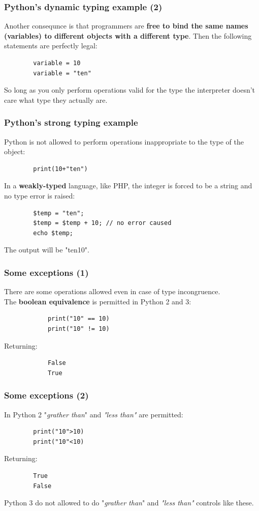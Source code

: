 \documentclass[xcolor ={table,usenames,dvipsnames}]{beamer}
\theoremstyle{definition}
\begin{document}
	\begin{frame}[fragile]
		\frametitle{Python's dynamic typing example (2)}
		Another consequnce is that programmers are \textbf{free to bind the same names (variables) to different objects with a different type}. Then the following statements are perfectly legal:
		
		\begin{lstlisting}
		variable = 10
		variable = "ten"
		\end{lstlisting}
		
		So long as you only perform operations valid for the type the interpreter doesn't care what type they actually are. 
	\end{frame}

	\begin{frame}[fragile]
		\frametitle{Python's strong typing example}
		Python is not allowed to perform operations inappropriate to the type of the object: 
		\begin{lstlisting}
		print(10+"ten")
		\end{lstlisting}
		
		In a \textbf{weakly-typed} language, like PHP, the integer is forced to be a string and no type error is raised:
		\begin{lstlisting}
		$temp = "ten"; 
		$temp = $temp + 10; // no error caused
		echo $temp;
		\end{lstlisting}
	The output will be "ten10".
	\end{frame}

	\begin{frame}[fragile]
		\frametitle{Some exceptions (1)}
		There are some operations allowed even in case of type incongruence.\\
		The\textbf{ boolean equivalence} is permitted in Python 2 and 3: 
		
		\begin{lstlisting}
			print("10" == 10)
			print("10" != 10)
		\end{lstlisting}
		Returning:
		\begin{lstlisting}
			False
			True
		\end{lstlisting}
	\end{frame}

	\begin{frame}[fragile]
		\frametitle{Some exceptions (2)}
		In Python 2 "\textit{grather than}" and \textit{"less than"} are permitted:
		
		\begin{lstlisting}
		print("10">10)
		print("10"<10)
		\end{lstlisting}
		
		Returning:
		
		\begin{lstlisting}
		True
		False
		\end{lstlisting}
		
		Python 3 do not allowed to do "\textit{grather than}" and \textit{"less than"} controls like these.\\	
	\end{frame}
\end{document}
